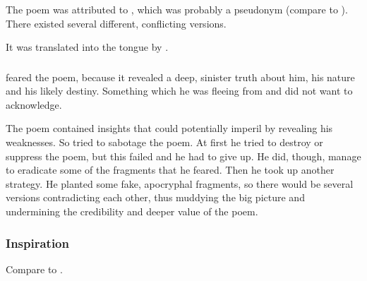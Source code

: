 The poem was attributed to , which was probably a pseudonym (compare to ). 
There existed several different, conflicting versions. 

It was translated into the \resphan tongue by . 





\subsubsection{\Ishnaruchaefir}

\Ishnaruchaefir{} feared the poem, because it revealed a deep, sinister truth about him, his nature and his likely destiny. 
Something which he was fleeing from and did not want to acknowledge. 

The poem contained insights that could potentially imperil \Ishnaruchaefir by revealing his weaknesses. 
So \Ishnaruchaefir tried to sabotage the poem. 
At first he tried to destroy or suppress the poem, but this failed and he had to give up. 
He did, though, manage to eradicate some of the fragments that he feared. 
Then he took up another strategy. 
He planted some fake, apocryphal fragments, so there would be several versions contradicting each other, thus muddying the big picture and undermining the credibility and deeper value of the poem. 





\subsubsection{Inspiration}
Compare to \RWCTKIY.



